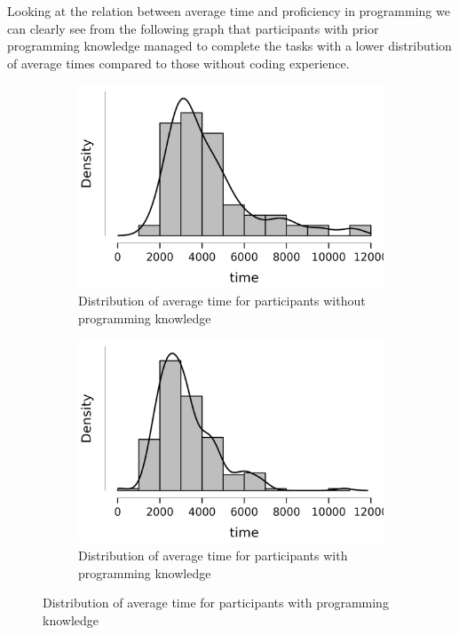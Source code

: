 \documentclass{article}
\begin{document}
Looking at the relation between average time and proficiency in programming we can clearly see from the following graph that participants with 
prior programming knowledge managed to complete the tasks with a lower distribution of average times compared to those without coding experience.

\begin{figure}[h!]
    \centering
		\begin{subfigure}{0.49\textwidth}
			\includegraphics[width=\textwidth]{images/prog_false.png}
			\caption{Distribution of average time for participants without programming knowledge}
		\end{subfigure}
		\begin{subfigure}{0.49\textwidth}
			\includegraphics[width=\textwidth]{images/prog_true.png}
			\caption{Distribution of average time for participants with programming knowledge}
		\end{subfigure}
\end{figure}
\end{document}
